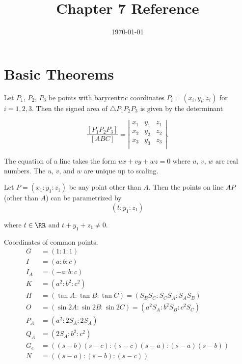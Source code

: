 \documentclass[11pt]{scrartcl}
\begin{document}
\title{Chapter 7 Reference}
\date{\today}
\maketitle

\section{Basic Theorems}
\begin{theorem}
  Let $P_1$, $P_2$, $P_3$ be points with barycentric coordinates $P_i = (x_i, y_i, z_i)$ for $i = 1, 2, 3$. Then the signed area of $\triangle P_1P_2P_3$ is given by the determinant

  \[\frac{\left[P_1P_2P_3\right]}{\left[ABC\right]}=
    \left\lvert
    \begin{array}{ccc}
      x_1 & y_1 & z_1 \\
      x_2 & y_2 & z_2 \\
      x_3 & y_3 & z_3 \\
    \end{array}
    \right\rvert.
  \]

\end{theorem}

\begin{theorem}
  The equation of a line takes the form $ux + vy + wz = 0$ where $u$, $v$, $w$ are real numbers. The $u$, $v$, and $w$ are unique up to scaling.
\end{theorem}

\begin{theorem}
  Let $P = (x_1 : y_1 : z_1)$ be any point other than $A$. Then the points on line $AP$ (other than $A$) can be parametrized by
  \[(t:y_1:z_1)\]

  \noindent
  where $t\in \RR$ and $t+y_1+z_1 \neq 0$.

\end{theorem}

Coordinates of common points:
\begin{align*}
  G &= (1:1:1)\\
  I &= (a:b:c)\\
  I_A &= (-a:b:c)\\
  K &= (a^2:b^2:c^2)\\
  H &= (\tan A:\tan B:\tan C) = (S_BS_C:S_CS_A:S_AS_B)\\
  O &= (\sin 2A:\sin 2B:\sin 2C) = (a^2S_A:b^2S_B:c^2S_C)\\
  P_A &= (a^2 : 2S_A : 2S_A)\\
  Q_A &= (2S_A : b^2 : c^2)\\
  G_e &= ((s-b)(s-c) : (s-c)(s-a) : (s-a)(s-b))\\
  N &= ((s-a) : (s-b) : (s-c))
\end{align*}
\end{document}
